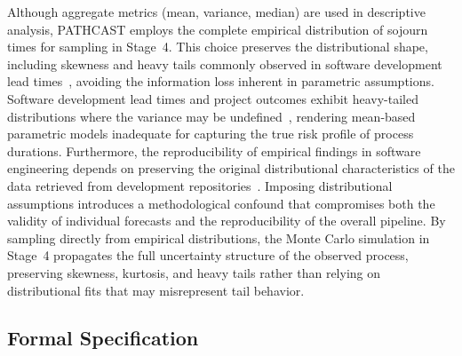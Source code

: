 \begin{remark}
\label{rem:empirical-distributions}
Although aggregate metrics (mean, variance, median) are used in descriptive
analysis, PATHCAST employs the complete empirical distribution of
sojourn times for sampling in Stage~4. This choice preserves the
distributional shape, including skewness and heavy tails commonly observed
in software development lead
times~\cite{little2011factory, flyvbjerg2022empirical}, avoiding the
information loss inherent in parametric assumptions. Software development
lead times and project outcomes exhibit heavy-tailed distributions where
the variance may be undefined~\cite{flyvbjerg2022empirical}, rendering
mean-based parametric models inadequate for capturing the true risk
profile of process durations. Furthermore, the reproducibility of
empirical findings in software engineering depends on preserving the
original distributional characteristics of the data retrieved from
development repositories~\cite{gonzalezbarahona2014reproducibility}.
Imposing distributional assumptions introduces a methodological confound
that compromises both the validity of individual forecasts and the
reproducibility of the overall pipeline. By sampling directly from
empirical distributions, the Monte Carlo simulation in Stage~4 propagates
the full uncertainty structure of the observed process, preserving
skewness, kurtosis, and heavy tails rather than relying on distributional
fits that may misrepresent tail behavior.
\end{remark}

\subsection{Formal Specification}
\label{sec:s3-formal}

